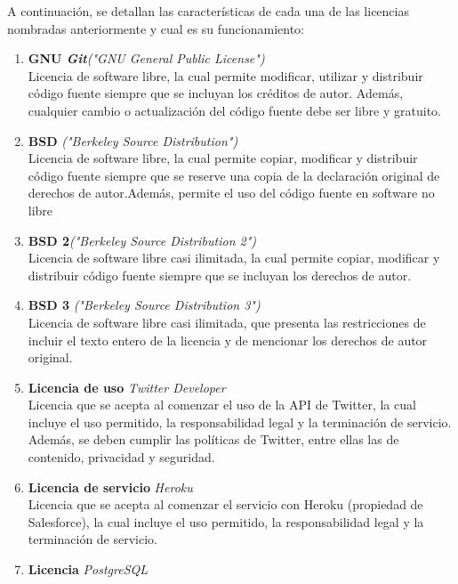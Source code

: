 A continuación, se detallan las características de cada una de las licencias nombradas anteriormente y cual es su funcionamiento:\\

\begin{enumerate}
    \item {\textbf{GNU \textit{Git}}\textit{("GNU General Public License")}}\cite{GNU}\\
    Licencia de software libre, la cual permite modificar, utilizar y distribuir código fuente siempre que se incluyan los créditos de autor.
    Además, cualquier cambio o actualización del código fuente debe ser libre y gratuito.
    \item {\textbf{BSD }\textit{("Berkeley Source Distribution")}}\cite{BSD}\\
    Licencia de software libre, la cual permite copiar, modificar y distribuir código fuente siempre que se reserve una copia de la declaración original de derechos de autor.Además, permite el uso del código fuente en software no libre
    \item {\textbf{BSD 2}\textit{("Berkeley Source Distribution 2")}}\cite{BSD2}\\
    Licencia de software libre casi ilimitada, la cual permite copiar, modificar y distribuir código fuente siempre que se incluyan los derechos de autor.
     \item {\textbf{BSD 3 }\textit{("Berkeley Source Distribution 3")}}\cite{BSD3}\\
    Licencia de software libre casi ilimitada, que presenta las restricciones de incluir el texto entero de la licencia y de mencionar los derechos de autor original.
    \item {\textbf{Licencia de uso } \textit{Twitter Developer}}\cite{LicenciaUso}\\
    Licencia que se acepta al comenzar el uso de la API de Twitter, la cual incluye el uso permitido, la responsabilidad legal y la terminación de servicio.
    Además, se deben cumplir las políticas de Twitter, entre ellas las de contenido, privacidad y seguridad.
    \item {\textbf{Licencia de servicio } \textit{Heroku}}\cite{LicenciaServicio}\\
    Licencia que se acepta al comenzar el servicio con Heroku (propiedad de Salesforce), la cual incluye el uso permitido, la responsabilidad legal y la terminación de servicio.
    \item {\textbf{Licencia } \textit{PostgreSQL}}\cite{LicenciaPostgreSQL}\\\

\end{enumerate}
